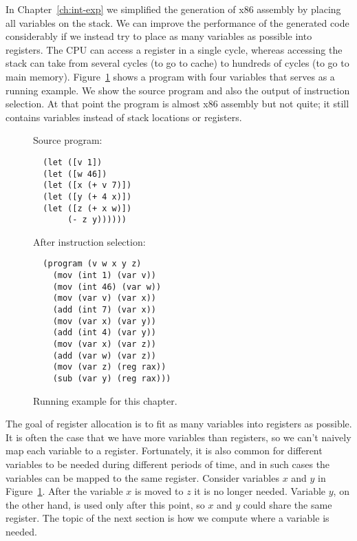 \documentclass[12pt]{book}
\begin{document}
In Chapter~\ref{ch:int-exp} we simplified the generation of x86
assembly by placing all variables on the stack. We can improve the
performance of the generated code considerably if we instead try to
place as many variables as possible into registers.  The CPU can
access a register in a single cycle, whereas accessing the stack can
take from several cycles (to go to cache) to hundreds of cycles (to go
to main memory).  Figure~\ref{fig:reg-eg} shows a program with four
variables that serves as a running example. We show the source program
and also the output of instruction selection. At that point the
program is almost x86 assembly but not quite; it still contains
variables instead of stack locations or registers.

\begin{figure}
\begin{minipage}{0.45\textwidth}
Source program:
\begin{lstlisting}
  (let ([v 1])
  (let ([w 46])
  (let ([x (+ v 7)])
  (let ([y (+ 4 x)])
  (let ([z (+ x w)])
       (- z y))))))
\end{lstlisting}
\end{minipage}
\begin{minipage}{0.45\textwidth}
After instruction selection:
\begin{lstlisting}
  (program (v w x y z)
    (mov (int 1) (var v))
    (mov (int 46) (var w))
    (mov (var v) (var x))
    (add (int 7) (var x))
    (mov (var x) (var y))
    (add (int 4) (var y))
    (mov (var x) (var z))
    (add (var w) (var z))
    (mov (var z) (reg rax))
    (sub (var y) (reg rax)))
\end{lstlisting}
\end{minipage}
\caption{Running example for this chapter.}
\label{fig:reg-eg}
\end{figure}

The goal of register allocation is to fit as many variables into
registers as possible. It is often the case that we have more
variables than registers, so we can't naively map each variable to a
register. Fortunately, it is also common for different variables to be
needed during different periods of time, and in such cases the
variables can be mapped to the same register.  Consider variables $x$
and $y$ in Figure~\ref{fig:reg-eg}.  After the variable $x$ is moved
to $z$ it is no longer needed.  Variable $y$, on the other hand, is
used only after this point, so $x$ and $y$ could share the same
register. The topic of the next section is how we compute where a
variable is needed.
\end{document}
